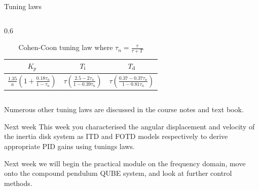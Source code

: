 \documentclass[9pt]{beamer-control}
\begin{document}
\begin{frame}{Tuning laws}
\begin{columns}
\begin{column}{0.6\textwidth}
      \begin{table}
        \centering
        \begin{tabular}{|c|c|c|}
          \hline
          $K_p$ & $T_{\mathrm{i}}$ & $T_{\mathrm{d}}$\\
          \hline
          \tiny{$\frac{1.35}{a}\left(1 + \frac{0.18 \tau_n}{1-\tau_n} \right)$} & \tiny{$ \tau\left( \frac{2.5-2\tau_n}{1-0.39\tau_n} \right) $} & \tiny{$\tau \left( \frac{0.37-0.37\tau_n}{1-0.81\tau_n} \right)$}\\
          \hline
        \end{tabular}
        \caption{Cohen-Coon tuning law where $\tau_n=\frac{\tau}{\tau+T}$}
      \end{table}
    \end{column}
  \end{columns}
  \raggedright
  Numerous other tuning laws are discussed in the course notes and text book.


\end{frame}


\begin{frame}{Next week}
  This week you characterised the angular displacement and velocity of the inertia disk system as ITD and FOTD models respectively to derive appropriate PID gains using tunings laws.

  Next week we will begin the practical module on the frequency domain, move onto the compound pendulum QUBE system, and look at further control methods.
\end{frame}
\end{document}
